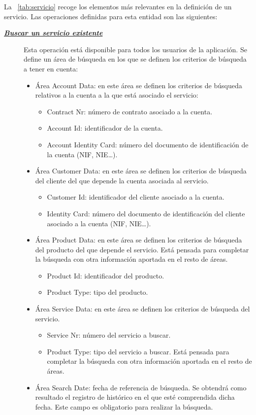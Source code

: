 La \tablename~\ref{tab:servicio} recoge los elementos más relevantes en la definición de un servicio.
Las operaciones definidas para esta entidad son las siguientes:
\begin{description}
\item[\underline{\textsl{\textbf{Buscar un servicio existente}}}] Esta operación está disponible para todos los usuarios de la aplicación.
Se define un área de búsqueda en los que se definen los criterios de búsqueda a tener en cuenta:
\begin{itemize}
	\item Área Account Data: en este área se definen los criterios de búsqueda relativos a la cuenta a la que está asociado el servicio:
		\begin{itemize}
			\item Contract Nr: número de contrato asociado a la cuenta.
			\item Account Id: identificador de la cuenta.
			\item Account Identity Card: número del documento de identificación de la cuenta (NIF, NIE\dots).
		\end{itemize}
	\item Área Customer Data: en este área se definen los criterios de búsqueda del cliente del que depende la cuenta asociada al servicio.
		\begin{itemize}
			\item Customer Id: identificador del cliente asociado a la cuenta.
			\item Identity Card: número del documento de identificación del cliente asociado a la cuenta (NIF, NIE\dots).
		\end{itemize}
	\item Área Product Data: en este área se definen los criterios de búsqueda del producto del que depende el servicio. Está pensada para completar la búsqueda con otra información aportada en el resto de áreas.	
		\begin{itemize}
			\item Product Id: identificador del producto.
			\item Product Type: tipo del producto.
		\end{itemize}
	\item Área Service Data: en este área se definen los criterios de búsqueda del servicio.
		\begin{itemize}
			\item Service Nr: número del servicio a buscar.
			\item Product Type: tipo del servicio a buscar. Está pensada para completar la búsqueda con otra información aportada en el resto de áreas.
		\end{itemize}
	\item Área Search Date: fecha de referencia de búsqueda. Se obtendrá como resultado el registro de histórico en el que esté comprendida dicha fecha. Este campo es obligatorio para realizar la búsqueda.
\end{itemize}


\end{description}
